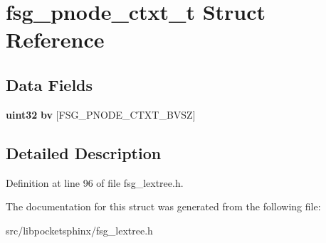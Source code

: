 \section{fsg\-\_\-pnode\-\_\-ctxt\-\_\-t \-Struct \-Reference}
\label{structfsg__pnode__ctxt__t}
\subsection*{\-Data \-Fields}
\begin{DoxyCompactItemize}
\item 
{\bf uint32} {\bfseries bv} [\-F\-S\-G\-\_\-\-P\-N\-O\-D\-E\-\_\-\-C\-T\-X\-T\-\_\-\-B\-V\-S\-Z]\label{structfsg__pnode__ctxt__t_a5c6b0f2997dd312d73d710e2d86fcf71}

\end{DoxyCompactItemize}


\subsection{\-Detailed \-Description}


\-Definition at line 96 of file fsg\-\_\-lextree.\-h.



\-The documentation for this struct was generated from the following file\-:\begin{DoxyCompactItemize}
\item 
src/libpocketsphinx/fsg\-\_\-lextree.\-h\end{DoxyCompactItemize}
